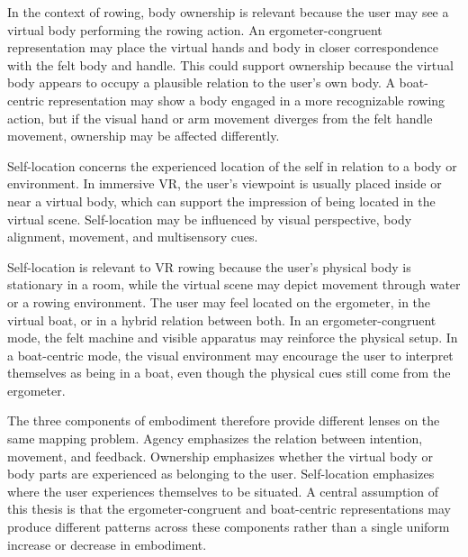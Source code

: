 In the context of rowing, body ownership is relevant because the user may see a virtual body performing the rowing action. An ergometer-congruent representation may place the virtual hands and body in closer correspondence with the felt body and handle. This could support ownership because the virtual body appears to occupy a plausible relation to the user's own body. A boat-centric representation may show a body engaged in a more recognizable rowing action, but if the visual hand or arm movement diverges from the felt handle movement, ownership may be affected differently.

Self-location concerns the experienced location of the self in relation to a body or environment. In immersive VR, the user's viewpoint is usually placed inside or near a virtual body, which can support the impression of being located in the virtual scene. Self-location may be influenced by visual perspective, body alignment, movement, and multisensory cues.

Self-location is relevant to VR rowing because the user's physical body is stationary in a room, while the virtual scene may depict movement through water or a rowing environment. The user may feel located on the ergometer, in the virtual boat, or in a hybrid relation between both. In an ergometer-congruent mode, the felt machine and visible apparatus may reinforce the physical setup. In a boat-centric mode, the visual environment may encourage the user to interpret themselves as being in a boat, even though the physical cues still come from the ergometer.

The three components of embodiment therefore provide different lenses on the same mapping problem. Agency emphasizes the relation between intention, movement, and feedback. Ownership emphasizes whether the virtual body or body parts are experienced as belonging to the user. Self-location emphasizes where the user experiences themselves to be situated. A central assumption of this thesis is that the ergometer-congruent and boat-centric representations may produce different patterns across these components rather than a single uniform increase or decrease in embodiment.

